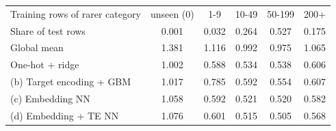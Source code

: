 \begin{tabular}{lccccc}
\toprule
Training rows of rarer category & unseen (0) & 1-9 & 10-49 & 50-199 & 200+ \\
Share of test rows & 0.001 & 0.032 & 0.264 & 0.527 & 0.175 \\
\midrule
Global mean & 1.381 & 1.116 & 0.992 & 0.975 & 1.065 \\
One-hot + ridge & 1.002 & 0.588 & 0.534 & 0.538 & 0.606 \\
(b) Target encoding + GBM & 1.017 & 0.785 & 0.592 & 0.554 & 0.607 \\
(c) Embedding NN & 1.058 & 0.592 & 0.521 & 0.520 & 0.582 \\
(d) Embedding + TE NN & 1.076 & 0.601 & 0.515 & 0.505 & 0.568 \\
\bottomrule
\end{tabular}
